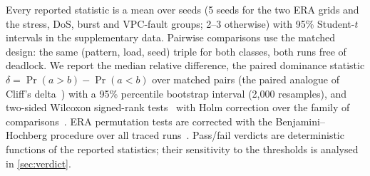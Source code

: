 Every reported statistic is a mean over seeds (5 seeds for the two ERA grids and the stress, DoS, burst and VPC-fault groups; 2--3 otherwise) with 95\% Student-$t$ intervals in the supplementary data. Pairwise comparisons use the matched design: the same (pattern, load, seed) triple for both classes, both runs free of deadlock. We report the median relative difference, the paired dominance statistic $\delta=\Pr(a>b)-\Pr(a<b)$ over matched pairs (the paired analogue of Cliff's delta~\cite{cliff1993dominance}) with a 95\% percentile bootstrap interval (2,000 resamples), and two-sided Wilcoxon signed-rank tests~\cite{wilcoxon1945} with Holm correction over the family of  comparisons~\cite{holm1979}. ERA permutation tests are corrected with the Benjamini--Hochberg procedure over all traced runs~\cite{benjamini1995fdr}. Pass/fail verdicts are deterministic functions of the reported statistics; their sensitivity to the thresholds is analysed in \cref{sec:verdict}.
